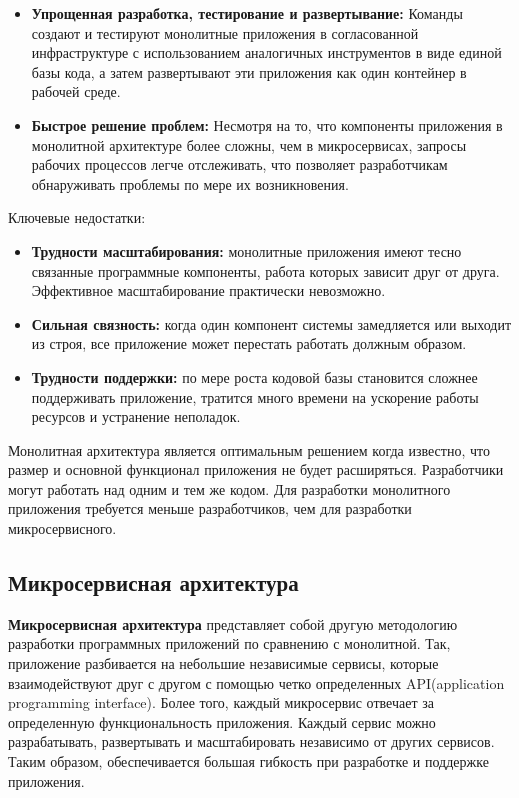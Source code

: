         \begin{itemize}
            \item \textbf{Упрощенная разработка, тестирование и развертывание:} Команды создают и тестируют монолитные приложения в согласованной инфраструктуре с использованием аналогичных инструментов в виде единой базы кода, а затем развертывают эти приложения как один контейнер в рабочей среде.
            \item \textbf{Быстрое решение проблем:} Несмотря на то, что компоненты приложения в монолитной архитектуре более сложны, чем в микросервисах, запросы рабочих процессов легче отслеживать, что позволяет разработчикам обнаруживать проблемы по мере их возникновения. \cite{monovsmicro}
            
        \end{itemize}

         Ключевые недостатки:
          \begin{itemize}
            \item \textbf{Трудности масштабирования:} монолитные приложения имеют тесно связанные программные компоненты, работа которых зависит друг от друга. Эффективное масштабирование практически невозможно. 
            \item \textbf{Сильная связность:} когда один компонент системы замедляется или выходит из строя, все приложение может перестать работать должным образом.
            \item \textbf{Трудноcти поддержки:} по мере роста кодовой базы становится сложнее поддерживать приложение, тратится много времени на ускорение работы ресурсов и устранение неполадок. \cite{baeldung, monovsmicro}

            
            
        \end{itemize}

        Монолитная архитектура является оптимальным решением когда известно, что размер и основной функционал приложения не будет расширяться. Разработчики могут работать над одним и тем же кодом. Для разработки монолитного приложения требуется меньше разработчиков, чем для разработки микросервисного. 
        
        \subsection{Микросервисная архитектура}
        \textbf{Микросервисная архитектура} представляет собой другую методологию разработки программных приложений по сравнению с монолитной. Так, приложение разбивается на небольшие независимые сервисы, которые взаимодействуют друг с другом с помощью четко определенных API(application programming interface). Более того, каждый микросервис отвечает за определенную функциональность приложения. Каждый сервис можно разрабатывать, развертывать и масштабировать независимо от других сервисов. Таким образом, обеспечивается большая гибкость при разработке и поддержке приложения. \cite{baeldung, monovsmicro}
        
